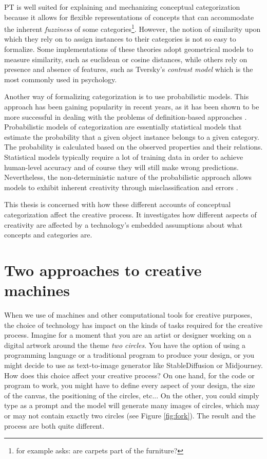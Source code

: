 PT is well suited for explaining and mechanizing conceptual categorization because it allows for flexible representations of concepts that can accommodate the inherent \emph{fuzziness} of some categories\footnote{\cite{Medin1989} for example asks: are carpets part of the furniture?}. However, the notion of similarity upon which they rely on to assign instances to their categories is not so easy to formalize. Some implementations of these theories adopt geometrical models to measure similarity, such as euclidean or cosine distances, while others rely on presence and absence of features, such as Tversky's \emph{contrast model} \citep{ Tversky1977} which is the most commonly used in psychology.

Another way of formalizing categorization is to use probabilistic models. This approach has been gaining popularity in recent years, as it has been shown to be more successful in dealing with the problems of definition-based approaches \citep{Huellermeier2021,Xu2021,Linardatos2020}. Probabilistic models of categorization are essentially statistical models that estimate the probability that a given object instance belongs to a given category. The probability is calculated based on the observed properties and their relations. Statistical models typically require a lot of training data in order to achieve human-level accuracy and of course they will still make wrong predictions. Nevertheless, the non-deterministic nature of the probabilistic approach allows models to exhibit inherent creativity through misclassification and errors \citep{Hoorn2023}. 

This thesis is concerned with how these different accounts of conceptual categorization affect the creative process. It investigates how different aspects of creativity are affected by a technology's embedded assumptions about what concepts and categories are.

\section{Two approaches to creative machines}

When we use of machines and other computational tools for creative purposes, the choice of technology has impact on the kinds of tasks required for the creative process. Imagine for a moment that you are an artist or designer working on a digital artwork around the theme \emph{two circles}. You have the option of using a programming language or a traditional program to produce your design, or you might decide to use as text-to-image generator like StableDiffusion or Midjourney. How does this choice affect your creative process? On one hand, for the code or program to work, you might have to define every aspect of your design, the size of the canvas, the positioning of the circles, etc... On the other, you could simply type  as a prompt and the model will generate many images of circles, which may or may not contain exactly two circles (see Figure \ref{fig:fork}). The result and the process are both quite different.

